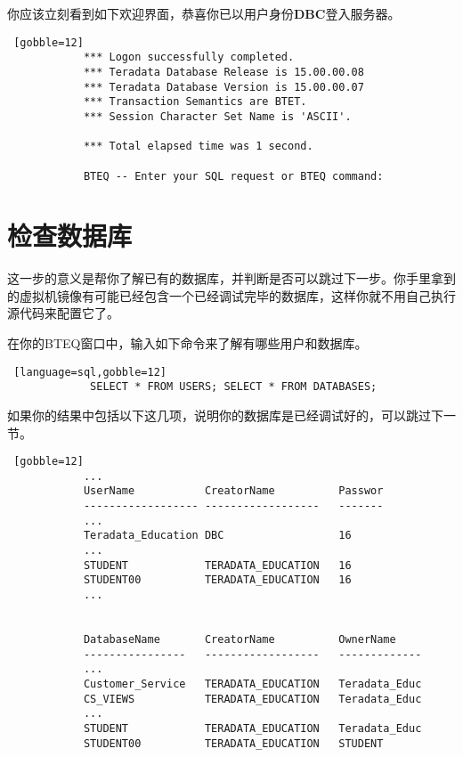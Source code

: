 \documentclass{article}
\begin{document}
		你应该立刻看到如下欢迎界面，恭喜你已以用户身份\textbf{DBC}登入服务器。

		\begin{lstlisting} [gobble=12]
			*** Logon successfully completed.               
			*** Teradata Database Release is 15.00.00.08    
			*** Teradata Database Version is 15.00.00.07    
			*** Transaction Semantics are BTET.             
			*** Session Character Set Name is 'ASCII'.      
			                                                
			*** Total elapsed time was 1 second.            
			                                                
			BTEQ -- Enter your SQL request or BTEQ command: 
		\end{lstlisting}

	\section{检查数据库} %

		这一步的意义是帮你了解已有的数据库，并判断是否可以跳过下一步。你手里拿到的虚拟机镜像有可能已经包含一个已经调试完毕的数据库，这样你就不用自己执行源代码来配置它了。

		在你的BTEQ窗口中，输入如下命令来了解有哪些用户和数据库。

		\begin{lstlisting} [language=sql,gobble=12]
			 SELECT * FROM USERS; SELECT * FROM DATABASES;
		\end{lstlisting}

		如果你的结果中包括以下这几项，说明你的数据库是已经调试好的，可以跳过下一节。
		\begin{lstlisting} [gobble=12]
			...
			UserName           CreatorName          Passwor
			------------------ ------------------   -------
			...
			Teradata_Education DBC      	        16
			...        
			STUDENT            TERADATA_EDUCATION   16
			STUDENT00          TERADATA_EDUCATION   16
			...


			DatabaseName       CreatorName          OwnerName
			----------------   ------------------   -------------
			...
			Customer_Service   TERADATA_EDUCATION   Teradata_Educ
			CS_VIEWS           TERADATA_EDUCATION   Teradata_Educ
			...
			STUDENT            TERADATA_EDUCATION   Teradata_Educ
			STUDENT00          TERADATA_EDUCATION   STUDENT


		\end{lstlisting}

\end{document}
